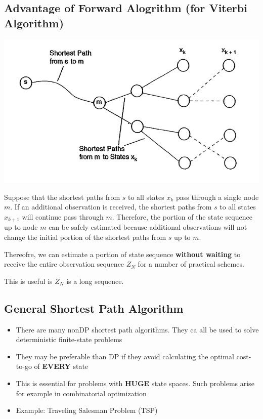 \subsection{Advantage of Forward Alogrithm (for Viterbi Algorithm)}
\centerline{\includegraphics[width=15cm]{Lecture2/Fig4.png}}
Suppose that the shortest paths from $s$ to all states $x_k$ pass through a single node $m$. If an additional observation is received, the shortest 
paths from $s$ to all states $x_{k+1}$ will continue pass through $m$. Therefore, the portion of the state sequence up to node $m$ can be safely estimated because 
additional observations will not change the initial portion of the shortest paths from $s$ up to $m$. 

Thereofre, we can estimate a portion of state sequence \textbf{without waiting} to receive the entire observation sequence $Z_N$ for a number of practical schemes.

This is useful is $Z_N$ is a long sequence.

\subsection{General Shortest Path Algorithm}
\begin{itemize}
    \item There are many nonDP shortest path algorithms. They ca all be used to solve deterministic finite-state problems
    \item They may be preferable than DP if they avoid calculating the optimal cost-to-go of \textbf{EVERY} state
    \item This is essential for problems with \textbf{HUGE} state spaces. Such problems arise for example in combinatorial optimization
    \item Example: Traveling Salesman Problem (TSP)
\end{itemize}

